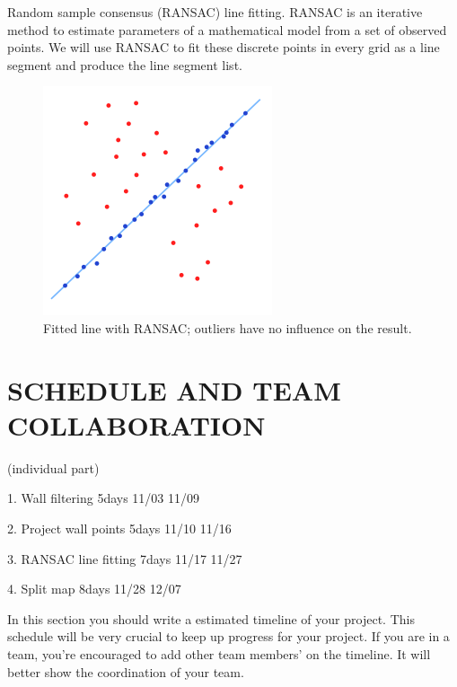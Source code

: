 \documentclass[letterpaper, 10 pt, conference]{ieeeconf}  %
\begin{document}
Random sample consensus (RANSAC) line fitting. RANSAC is an iterative method to estimate parameters of a mathematical model from a set of observed points. We will use RANSAC to fit these discrete points in every grid as a line segment and produce the line segment list.
\begin{figure}[h] %
\includegraphics[width=0.5\columnwidth]{RANSAC.png}
\centering
\caption{Fitted line with RANSAC; outliers have no influence on the result.}
\end{figure}




\section{SCHEDULE AND TEAM COLLABORATION}

(individual part)

1. Wall filtering	    5days	11/03	11/09

2. Project wall points	5days	11/10	11/16

3. RANSAC line fitting	7days	11/17	11/27

4. Split map	        8days	11/28	12/07

In this section you should write a estimated timeline of your project. This schedule will be very crucial to keep up progress for your project. If you are in a team, you're encouraged to add other team members' on the timeline. It will better show the coordination of your team.
   

\addtolength{\textheight}{-12cm}   %



\end{document}
